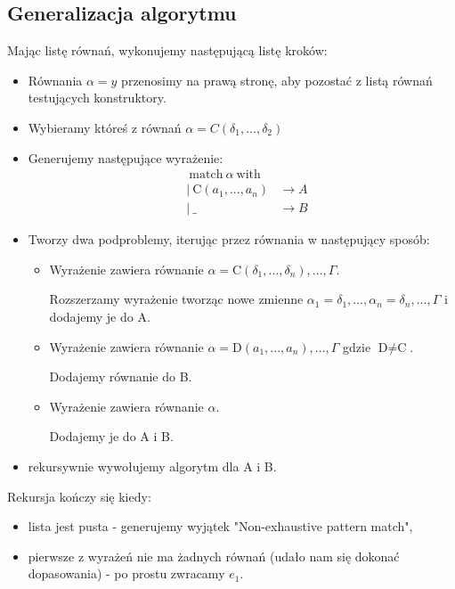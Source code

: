 \documentclass{article}
\begin{document}
\subsection{Generalizacja algorytmu}
Mając listę równań, wykonujemy następującą listę kroków:
\begin{itemize}
  \item Równania $\alpha=y$ przenosimy na prawą stronę, aby pozostać z listą równań testujących konstruktory.
  \item Wybieramy któreś z równań $\alpha=C(\delta_1,...,\delta_2)$
  \item Generujemy następujące wyrażenie:
        \begin{align*}
           & \ \text{match}\ \alpha\ \text{with}                 \\
           & |\  \text{C}(a_1,..., a_n)          & \rightarrow A \\
           & |\ \_                               & \rightarrow B
        \end{align*}
  \item Tworzy dwa podproblemy, iterując przez równania w następujący sposób:
        \begin{itemize}
          \item Wyrażenie zawiera równanie $\alpha=\text{C}(\delta_1,..., \delta_n),...,\Gamma$.

                Rozszerzamy wyrażenie tworząc nowe zmienne $\alpha_1=\delta_1,...,\alpha_n=\delta_n,...,\Gamma$ i dodajemy je do A.
          \item Wyrażenie zawiera równanie $\alpha=\text{D}(a_1,..., a_n),...,\Gamma$ gdzie $\text{D}\ne\text{C}$.

                Dodajemy równanie do B.

          \item Wyrażenie zawiera równanie $\alpha$.

                Dodajemy je do A i B.
        \end{itemize}
  \item rekursywnie wywołujemy algorytm dla A i B.
\end{itemize}
Rekursja kończy się kiedy: 
\begin{itemize}
  \item lista jest pusta - generujemy wyjątek "Non-exhaustive pattern match",
  \item pierwsze z wyrażeń nie ma żadnych równań (udało nam się dokonać dopasowania) - po prostu zwracamy $e_1$.
\end{itemize}
\end{document}
